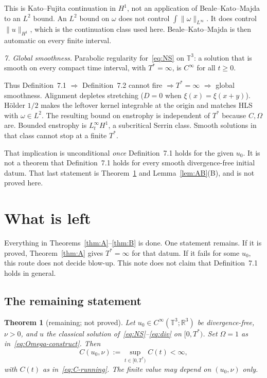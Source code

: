 \documentclass[11pt,a4paper]{article}
\newtheorem{theorem}{Theorem}
\theoremstyle{definition}
\theoremstyle{remark}
\newcommand{\R}{\mathbb{R}}
\newcommand{\T}{\mathbb{T}}
\newcommand{\norm}[1]{\lVert#1\rVert}
\begin{document}
This is Kato--Fujita continuation in \(H^1\), not an application of
Beale--Kato--Majda to an \(L^2\) bound. An \(L^2\) bound on \(\omega\)
does not control \(\int\norm{\omega}_{L^\infty}\). It does control
\(\norm{u}_{H^1}\), which is the continuation class used here.
Beale--Kato--Majda is then automatic on every finite interval.

\textit{7. Global smoothness.}
Parabolic regularity for~\eqref{eq:NS} on \(\T^3\): a solution that is
smooth on every compact time interval, with \(T^*=\infty\), is
\(C^\infty\) for all \(t\ge 0\).

Thus Definition~7.1 \(\Rightarrow\) Definition~7.2 cannot fire
\(\Rightarrow T^*=\infty\) \(\Rightarrow\) global smoothness.
Alignment depletes stretching (\(D=0\) when \(\xi(x)=\xi(x+y)\)).
H\"older \(1/2\) makes the leftover kernel integrable at the origin
and matches HLS with \(\omega\in L^2\). The resulting bound on
enstrophy is independent of \(T^*\) because \(C,\Omega\) are.
Bounded enstrophy is \(L^\infty_t H^1\), a subcritical Serrin class.
Smooth solutions in that class cannot stop at a finite \(T^*\).

That implication is unconditional \emph{once} Definition~7.1 holds for
the given \(u_0\). It is not a theorem that Definition~7.1 holds for
every smooth divergence-free initial datum. That last statement is
Theorem~\ref{thm:C} and Lemma~\ref{lem:AB}(B), and is not proved here.

\section{What is left}
\label{sec:left}

Everything in Theorems~\ref{thm:A}--\ref{thm:B} is done. One statement
remains. If it is proved, Theorem~\ref{thm:A} gives \(T^*=\infty\) for
that datum. If it fails for some \(u_0\), this route does not decide
blow-up. This note does not claim that Definition~7.1 holds in general.

\subsection{The remaining statement}

\begin{theorem}[remaining; not proved]
\label{thm:C}
Let \(u_0\in C^\infty(\T^3;\R^3)\) be divergence-free, \(\nu>0\), and
\(u\) the classical solution of~\eqref{eq:NS}--\eqref{eq:div} on
\([0,T^*)\). Set \(\Omega=1\) as in~\eqref{eq:Omega-construct}. Then
\begin{equation}
\label{eq:remaining}
C(u_0,\nu)
:=\sup_{t\in[0,T^*)}C(t)
<\infty,
\end{equation}
with \(C(t)\) as in~\eqref{eq:C-running}. The finite value may depend
on \((u_0,\nu)\) only.
\end{theorem}
\end{document}

